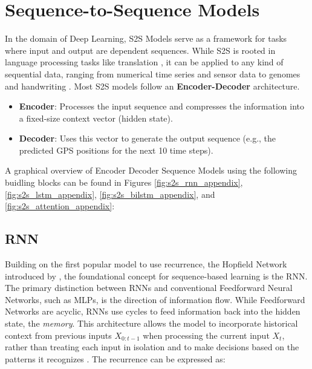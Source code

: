 \section{Sequence-to-Sequence Models}   


    In the domain of Deep Learning, \ac{S2S}  Models serve as a framework for tasks where input and output are dependent sequences. While \ac{S2S} is rooted in language processing tasks like translation \cite{sutskever2014sequencesequencelearningneural}, it can be %
    applied to any kind of sequential data, ranging from numerical time series and sensor data to genomes and handwriting \cite{gentleschmidt2019recurrentneuralnetworksrnns}. 
    Most \ac{S2S} models follow an \textbf{Encoder-Decoder} architecture. 
    \begin{itemize}
        \item \textbf{Encoder}: Processes the input sequence and compresses the information into a fixed-size context vector (hidden state).
        \item \textbf{Decoder}: Uses this vector to generate the output sequence (e.g., the predicted GPS positions for the next 10 time steps).
    \end{itemize}
    A graphical overview of Encoder Decoder Sequence Models using the following buidling blocks can be found in Figures \ref{fig:s2s_rnn_appendix}, \ref{fig:s2s_lstm_appendix}, \ref{fig:s2s_bilstm_appendix}, and \ref{fig:s2s_attention_appendix}:


    \subsection{RNN}
    Building on the first popular model to use recurrence, the Hopfield Network introduced by \cite{hopfieldrnn}, the foundational concept for sequence-based learning is the \ac{RNN}. 
    The primary distinction between \acp{RNN} and conventional Feedforward Neural Networks, such as \acp{MLP}, is the direction of information flow. While Feedforward Networks are acyclic, \acp{RNN} use cycles to feed information back into the hidden state, the \textit{memory}. This architecture allows the model to incorporate historical context from previous inputs $X_{0:t-1}$ when processing the current input $X_t$, rather than treating each input in isolation \cite{gentleschmidt2019recurrentneuralnetworksrnns} and to make decisions based on the patterns it recognizes \cite{AIBook}. The recurrence can be expressed as:

